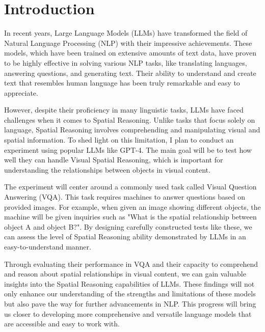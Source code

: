 \documentclass[twocolumn,11pt]{report}
\begin{document}
\newpage




\twocolumn
\chapter{Introduction}\label{chap:intro}

In recent years, Large Language Models (LLMs) have transformed the field of Natural Language Processing (NLP) with their impressive achievements. These models, which have been trained on extensive amounts of text data, have proven to be highly effective in solving various NLP tasks, like translating languages, answering questions, and generating text. Their ability to understand and create text that resembles human language has been truly remarkable and easy to appreciate.

However, despite their proficiency in many linguistic tasks, LLMs have faced challenges when it comes to Spatial Reasoning. Unlike tasks that focus solely on language, Spatial Reasoning involves comprehending and manipulating visual and spatial information. To shed light on this limitation, I plan to conduct an experiment using popular LLMs like GPT-4\cite{peng2023instruction}. The main goal will be to test how well they can handle Visual Spatial Reasoning, which is important for understanding the relationships between objects in visual content.

The experiment will center around a commonly used task called Visual Question Answering (VQA). This task requires machines to answer questions based on provided images. For example, when given an image showing different objects, the machine will be given inquiries such as "What is the spatial relationship between object A and object B?". By designing carefully constructed tests like these, we can assess the level of Spatial Reasoning ability demonstrated by LLMs in an easy-to-understand manner.

Through evaluating their performance in VQA and their capacity to comprehend and reason about spatial relationships in visual content, we can gain valuable insights into the Spatial Reasoning capabilities of LLMs. These findings will not only enhance our understanding of the strengths and limitations of these models but also pave the way for further advancements in NLP. This progress will bring us closer to developing more comprehensive and versatile language models that are accessible and easy to work with.
\end{document}
